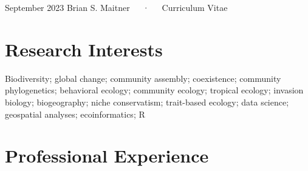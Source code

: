 \documentclass[11pt,a4paper,]{awesome-cv}
\begin{document}
\makecvheader

\makecvfooter
  {September 2023}
    {Brian S. Maitner~~~·~~~Curriculum Vitae}
  {\thepage}





\section{Research Interests}\label{research-interests}

Biodiversity; global change; community assembly; coexistence; community
phylogenetics; behavioral ecology; community ecology; tropical ecology;
invasion biology; biogeography; niche conservatism; trait-based ecology;
data science; geospatial analyses; ecoinformatics; R

\section{Professional Experience}\label{professional-experience}
\end{document}
